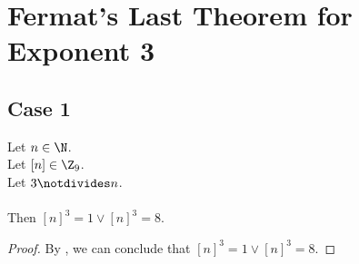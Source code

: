 
\chapter{Fermat's Last Theorem for Exponent 3}

\section{Case 1}


\begin{lemma}
  \label{lmm:cube_of_not_dvd}
  \leanok
  Let $n \in \N$. \\
  Let $\left[n \right] \in \Z_9$. \\
  Let $3 \notdivides n$. \\ \\
  Then $\left[n \right]^3 = 1 \lor \left[n \right]^3 = 8$.
\end{lemma}
\begin{proof}
  \leanok
  By , we can conclude that $\left[n \right]^3 = 1 \lor \left[n \right]^3 = 8$.
\end{proof}


